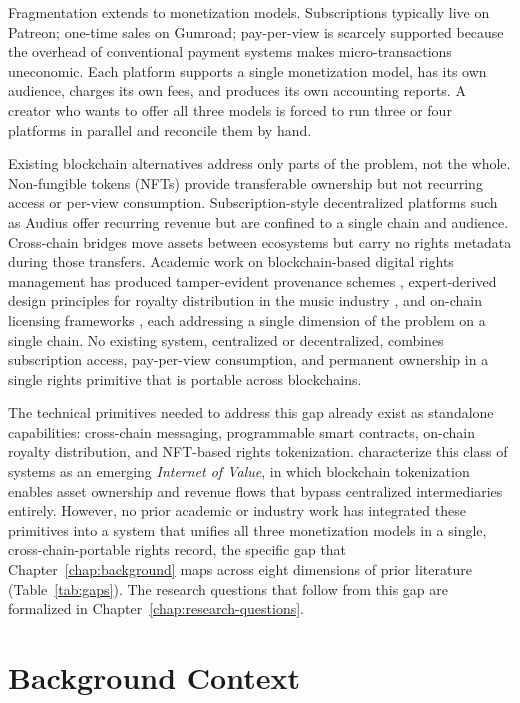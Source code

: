 Fragmentation extends to monetization models. Subscriptions typically live on Patreon; one-time sales on Gumroad; pay-per-view is scarcely supported because the overhead of conventional payment systems makes micro-transactions uneconomic. Each platform supports a single monetization model, has its own audience, charges its own fees, and produces its own accounting reports. A creator who wants to offer all three models is forced to run three or four platforms in parallel and reconcile them by hand.

Existing blockchain alternatives address only parts of the problem, not the whole. Non-fungible tokens (NFTs) provide transferable ownership but not recurring access or per-view consumption. Subscription-style decentralized platforms such as Audius offer recurring revenue but are confined to a single chain and audience. Cross-chain bridges move assets between ecosystems but carry no rights metadata during those transfers. Academic work on blockchain-based digital rights management has produced tamper-evident provenance schemes \citep{garbaEtAl2021, patilEtAl2022}, expert-derived design principles for royalty distribution in the music industry \citep{cirelloEtAl2023}, and on-chain licensing frameworks \citep{mendozaTelloEtAl2024}, each addressing a single dimension of the problem on a single chain. No existing system, centralized or decentralized, combines subscription access, pay-per-view consumption, and permanent ownership in a single rights primitive that is portable across blockchains.

The technical primitives needed to address this gap already exist as standalone capabilities: cross-chain messaging, programmable smart contracts, on-chain royalty distribution, and NFT-based rights tokenization. \citet{hannekeEtAl2024} characterize this class of systems as an emerging \emph{Internet of Value}, in which blockchain tokenization enables asset ownership and revenue flows that bypass centralized intermediaries entirely. However, no prior academic or industry work has integrated these primitives into a system that unifies all three monetization models in a single, cross-chain-portable rights record, the specific gap that Chapter~\ref{chap:background} maps across eight dimensions of prior literature (Table~\ref{tab:gaps}). The research questions that follow from this gap are formalized in Chapter~\ref{chap:research-questions}.

\section{Background Context}\label{sec:background-context}

